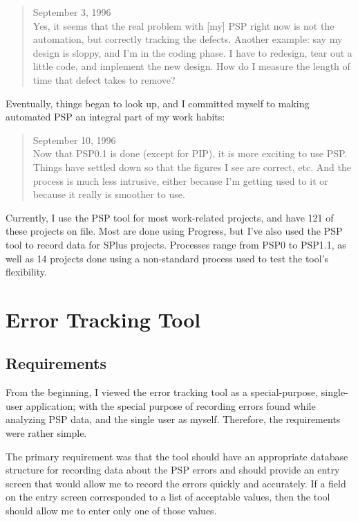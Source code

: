 \begin{quote}
  September 3, 1996\\
  Yes, it seems that the real problem with [my] PSP right now is not the
  automation, but correctly tracking the defects.  Another example: say my
  design is sloppy, and I'm in the coding phase.  I have to redesign, tear
  out a little code, and implement the new design.  How do I measure the
  length of time that defect takes to remove?
\end{quote}

Eventually, things began to look up, and I committed myself to making
automated PSP an integral part of my work habits:
\begin{quote}
  September 10, 1996\\
  Now that PSP0.1 is done (except for PIP), it is more exciting to use PSP.
  Things have settled down so that the figures I see are correct, etc.  And
  the process is much less intrusive, either because I'm getting used to it
  or because it really is smoother to use.
\end{quote}

Currently, I use the PSP tool for most work-related projects, and have 121
of these projects on file.  Most are done using Progress, but I've also
used the PSP tool to record data for SPlus projects.  Processes range from
PSP0 to PSP1.1, as well as 14 projects done using a non-standard process
used to test the tool's flexibility.


\section{Error Tracking Tool}

\subsection{Requirements}

From the beginning, I viewed the error tracking tool as a special-purpose,
single-user application; with the special purpose of recording errors
found while analyzing PSP data, and the single user as myself.  Therefore,
the requirements were rather simple.

The primary requirement was that the tool should have an appropriate
database structure for recording data about the PSP errors and should
provide an entry screen that would allow me to record the errors quickly
and accurately.  If a field on the entry screen corresponded to a list of
acceptable values, then the tool should allow me to enter only one of those
values.

